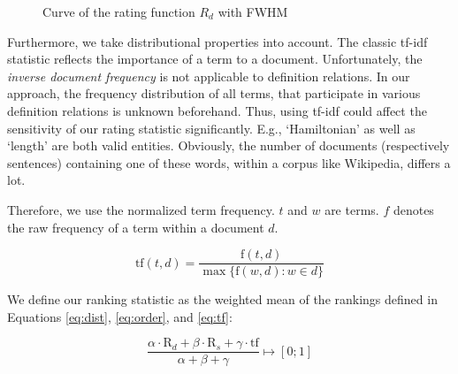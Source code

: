 \documentclass[runningheads]{llncs}
\begin{document}
\begin{figure}[H]
\centering
{}
\caption{Curve of the rating function $R_{d}$ with FWHM}
\end{figure}

Furthermore, we take distributional properties into account. The classic tf-idf \cite{Salton86} statistic reflects the importance of a term to a document. Unfortunately, the \emph{inverse document frequency} is not applicable to definition relations. In our approach, the frequency distribution of all terms, that participate in various definition relations is unknown beforehand. Thus, using tf-idf could affect the sensitivity of our rating statistic significantly. E.g., `Hamiltonian' as well as `length' are both valid entities. Obviously, the number of documents (respectively sentences) containing one of these words, within a corpus like Wikipedia, differs a lot.

Therefore, we use the normalized term frequency. $t$ and $w$ are terms. $f$ denotes the raw frequency of a term within a document $d$.

\begin{equation}
	\label{eq:tf}
	\mathrm{tf}(t,d) = \frac{\mathrm{f}(t,d)}{\max\{\mathrm{f}(w,d):w \in d\}}
\end{equation}

We define our ranking statistic as the weighted mean of the rankings defined in Equations \ref{eq:dist}, \ref{eq:order}, and \ref{eq:tf}:

\begin{equation}
	\label{eq:rating}
	\frac{\alpha\cdot\mathrm{R}_{d}+\beta\cdot\mathrm{R}_{s}+\gamma\cdot\mathrm{tf}}{\alpha+\beta+\gamma} \mapsto [0;1]
\end{equation}
\end{document}
